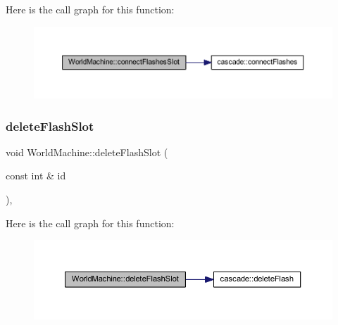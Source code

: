 Here is the call graph for this function\+:\nopagebreak
\begin{figure}[H]
\begin{center}
\leavevmode
\includegraphics[width=350pt]{class_world_machine_adb2d5067594fa2f04f4c1035025ebe86_cgraph}
\end{center}
\end{figure}
\mbox{\label{class_world_machine_abdd88afd0bef7ed98054e19cf59487c4}} 
\subsubsection{\texorpdfstring{delete\+Flash\+Slot}{deleteFlashSlot}}
{\footnotesize\ttfamily void World\+Machine\+::delete\+Flash\+Slot (\begin{DoxyParamCaption}\item[{const int \&}]{id }\end{DoxyParamCaption})\hspace{0.3cm}{\ttfamily [inline]}, {\ttfamily [slot]}}

Here is the call graph for this function\+:\nopagebreak
\begin{figure}[H]
\begin{center}
\leavevmode
\includegraphics[width=350pt]{class_world_machine_abdd88afd0bef7ed98054e19cf59487c4_cgraph}
\end{center}
\end{figure}
\mbox{\label{class_world_machine_aa59dea1c70b3767e42a624daba7497b9}} 
